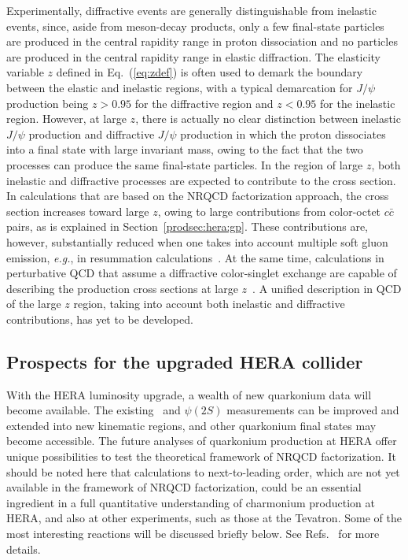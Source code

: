 Experimentally, diffractive events are generally distinguishable from
inelastic events, since, aside from meson-decay products, only a few
final-state particles are produced in the central rapidity range in
proton dissociation and no particles are produced in the central
rapidity range in elastic diffraction.
%
The elasticity variable $z$ defined in Eq.~(\ref{eq:zdef}) 
is often used to demark
the boundary between the elastic and inelastic regions, with a typical
demarcation for $J/\psi$ production being $z>0.95$ for the diffractive
region and $z<0.95$ for the inelastic region. However, at large $z$,
there is actually no clear distinction between inelastic $J/\psi$
production and diffractive $J/\psi$ production 
in which the proton dissociates
into a final state with large invariant mass, owing to the fact that the
two processes can produce the same final-state particles.
%
In the region of large $z$, both inelastic and
diffractive processes are expected to contribute to the cross section.
In calculations that are based on the NRQCD factorization approach, the
cross section increases toward large $z$, owing to large contributions
from color-octet $c \bar c$ pairs, as is explained in
Section~\ref{prodsec:hera:gp}. These contributions are, however,
substantially reduced when one takes into account multiple soft gluon
emission, {\it e.g.}, in resummation calculations~\cite{Beneke:1999gq}. 
At the same time, calculations in perturbative QCD that assume a
diffractive color-singlet exchange are capable of describing the
production cross sections at large
$z$~\cite{Aktas:2003zi,Chekanov:2002rm,zeus-eps03-549}. 
A unified description in QCD
of the large $z$ region, taking into account both inelastic and
diffractive contributions, has yet to be developed.

\subsection{Prospects for the upgraded HERA collider}

With the HERA luminosity upgrade, a wealth of new quarkonium data will
become available. The existing \jpsi\ and $\psi(2S)$ measurements can
be improved and extended into new kinematic regions, and other
quarkonium final states may become accessible.  The future analyses of
quarkonium production at HERA offer unique possibilities to test the
theoretical framework of NRQCD factorization. 
It should be noted here that calculations to next-to-leading order, which
are not yet available in the framework of NRQCD factorization, could 
be an essential ingredient in a 
full quantitative understanding of charmonium production at HERA, and
also at other experiments, such as those at the Tevatron.
Some of the most interesting reactions will be discussed briefly below. See
Refs.~\cite{Cacciari:1996dy,Kramer:2001hh} for more details.


